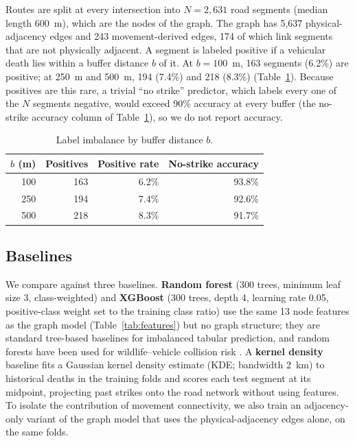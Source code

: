 Routes are split at every intersection into $N=2{,}631$ road segments (median length 600~m), which are the nodes of the graph. The graph has 5{,}637 physical-adjacency edges and 243 movement-derived edges, 174 of which link segments that are not physically adjacent. A segment is labeled positive if a vehicular death lies within a buffer distance $b$ of it. At $b=100$~m, 163 segments (6.2\%) are positive; at 250~m and 500~m, 194 (7.4\%) and 218 (8.3\%) (Table~\ref{tab:labels}). Because positives are this rare, a trivial ``no strike'' predictor, which labels every one of the $N$ segments negative, would exceed 90\% accuracy at every buffer (the no-strike accuracy column of Table~\ref{tab:labels}), so we do not report accuracy.

\begin{table}[t]
\centering
\small
\begin{tabular}{rrrr}
\hline
\textbf{$b$ (m)} & \textbf{Positives} & \textbf{Positive rate} & \textbf{No-strike accuracy} \\
\hline
100 & 163 & 6.2\% & 93.8\% \\
250 & 194 & 7.4\% & 92.6\% \\
500 & 218 & 8.3\% & 91.7\% \\
\hline
\end{tabular}
\caption{Label imbalance by buffer distance $b$.}
\label{tab:labels}
\end{table}

\subsection{Baselines}
We compare against three baselines. \textbf{Random forest} \cite{Breiman2001} (300 trees, minimum leaf size 3, class-weighted) and \textbf{XGBoost} \cite{Chen2016XGBoost} (300 trees, depth 4, learning rate 0.05, positive-class weight set to the training class ratio) use the same 13 node features as the graph model (Table~\ref{tab:features}) but no graph structure; they are standard tree-based baselines for imbalanced tabular prediction, and random forests have been used for wildlife--vehicle collision risk \cite{pagany2022spatiotemporal}. A \textbf{kernel density} baseline fits a Gaussian kernel density estimate (KDE; bandwidth 2~km) to historical deaths in the training folds and scores each test segment at its midpoint, projecting past strikes onto the road network without using features. To isolate the contribution of movement connectivity, we also train an adjacency-only variant of the graph model that uses the physical-adjacency edges alone, on the same folds.

